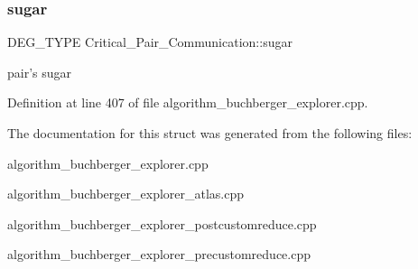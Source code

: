 \subsubsection{\texorpdfstring{sugar}{sugar}}
{\footnotesize\ttfamily D\+E\+G\+\_\+\+T\+Y\+PE Critical\+\_\+\+Pair\+\_\+\+Communication\+::sugar}



pair's sugar 



Definition at line 407 of file algorithm\+\_\+buchberger\+\_\+explorer.\+cpp.



The documentation for this struct was generated from the following files\+:\begin{DoxyCompactItemize}
\item 
algorithm\+\_\+buchberger\+\_\+explorer.\+cpp\item 
algorithm\+\_\+buchberger\+\_\+explorer\+\_\+atlas.\+cpp\item 
algorithm\+\_\+buchberger\+\_\+explorer\+\_\+postcustomreduce.\+cpp\item 
algorithm\+\_\+buchberger\+\_\+explorer\+\_\+precustomreduce.\+cpp\end{DoxyCompactItemize}

